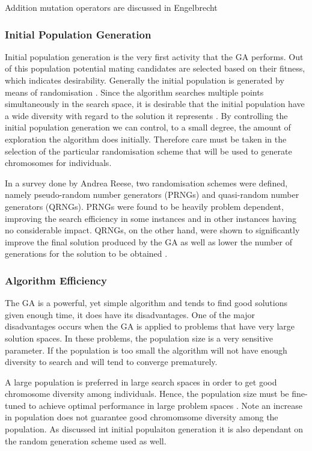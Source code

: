 Addition mutation operators are discussed in Engelbrecht\cite{CompuIntelligenceIntro}
\subsubsection{Initial Population Generation}
Initial population generation is the very first activity that the GA performs. Out of this population potential mating candidates are selected based on their fitness, which indicates desirability. Generally the initial population is generated by means of randomisation \cite{SelfAdaptiveGA}. Since the algorithm searches multiple points simultaneously in the search space, it is desirable that the initial population have a wide diversity with regard to the solution it represents \cite{CombinedBranchBoundGA,DistributedHierarchicalGA}. By controlling the initial population generation we can control, to a small degree, the amount of exploration the algorithm does initially\cite{CombinedBranchBoundGA}. Therefore care must be taken in the selection of the particular randomisation scheme that will be used to generate chromosomes for individuals.

In a survey done by Andrea Reese\cite{RandomNumberGA}, two randomisation schemes were defined, namely pseudo-random number generators (PRNGs) and quasi-random number generators (QRNGs). PRNGs were found to be heavily problem dependent, improving the search efficiency in some instances and in other instances having no considerable impact. QRNGs, on the other hand, were shown to significantly improve the final solution produced by the GA as well as lower the number of generations for the solution to be obtained \cite{RandomNumberGA}.

\subsubsection{Algorithm Efficiency}
The GA is a powerful, yet simple algorithm and tends to find good solutions given enough time, it does have its disadvantages. One of the major disadvantages occurs when the GA is applied to problems that have very large solution spaces. In these problems, the population size is a very sensitive parameter\cite{AdaptiveSAGA,HetergeneousGA,SelfAdaptiveDataMiningGA,PatternDetectionGA}. If the population is too small the algorithm will not have enough diversity to search and will tend to converge prematurely. 

A large population is preferred in large search spaces in order to get good chromosome diversity among individuals. Hence, the population size must be fine-tuned to achieve optimal performance in large problem spaces \cite{AdaptiveSAGA,CompuIntelligenceIntro}. Note an increase in population does not guarantee good chromomsome diversity among the population. As discussed int initial populaiton generation it is also dependant on the random generation scheme used as well. 


